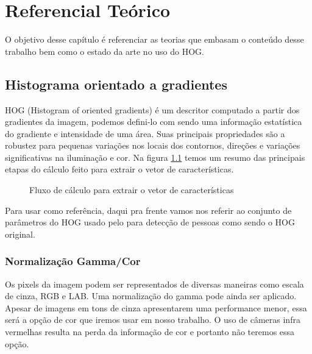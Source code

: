  \chapter{Referencial Teórico}

O objetivo desse capítulo é referenciar as teorias que embasam o conteúdo desse trabalho bem como o estado da arte no uso do HOG.

\section{Histograma orientado a gradientes}

HOG (Histogram of oriented gradients) é um descritor computado a partir dos gradientes da imagem, podemos defini-lo com sendo uma informação estatística do gradiente e intensidade de uma área. Suas principais propriedades são a robustez para pequenas variações nos locais dos contornos, direções e variações significativas na iluminação e cor. Na figura \ref{fig:hog} temos um resumo das principais etapas do cálculo feito para extrair o vetor de características.

\begin{figure}[ht!]
\centering
{}
  \caption{Fluxo de cálculo para extrair o vetor de características}
  \label{fig:hog}
\end{figure}

Para usar como referência, daqui pra frente vamos nos referir ao conjunto de parâmetros do HOG usado pelo  para detecção de pessoas como sendo o HOG original.

\subsection{Normalização Gamma/Cor}

Os pixels da imagem podem ser representados de diversas maneiras como escala de cinza, RGB e LAB. Uma normalização do gamma pode ainda ser aplicado. 
Apesar de imagens em tons de cinza apresentarem uma performance menor, essa será a opção de cor que iremos usar em nosso trabalho. O uso de câmeras infra vermelhas resulta na perda da informação de cor e portanto não teremos essa opção.

